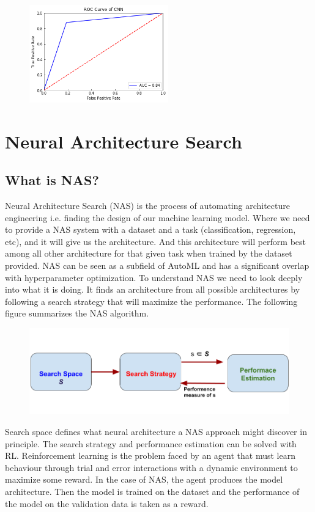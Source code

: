 \documentclass[12pt, a4paper]{article}
\begin{document}
\begin{figure}[ht]
	\centering
	\includegraphics[width =6cm]{roc_cnn.png}
\end{figure}

\section{Neural Architecture Search}

\subsection*{What is NAS?}
\noindent
Neural Architecture Search (NAS) is the process of automating architecture engineering i.e. finding the design of our machine learning model. Where we need to provide a NAS system with a dataset and a task (classification, regression, etc), and it will give us the architecture. And this architecture will perform best among all other architecture for that given task when trained by the dataset provided. NAS can be seen as a subfield of AutoML and has a significant overlap with hyperparameter optimization. To understand NAS we need to look deeply into what it is doing. It finds an architecture from all possible architectures by following a search strategy that will maximize the performance. The following figure summarizes the NAS algorithm.
\begin{figure}[ht]
	\centering
	\includegraphics[width=12cm]{nas.png}
\end{figure}

\noindent
Search space defines what neural architecture a NAS approach might discover in principle. The search strategy and performance estimation can be solved with RL. Reinforcement learning is the problem faced by an agent that must learn behaviour through trial and error interactions with a dynamic environment to maximize some reward. In the case of NAS, the agent produces the model architecture. Then the model is trained on the dataset and the performance of the model on the validation data is taken as a reward.
\end{document}
